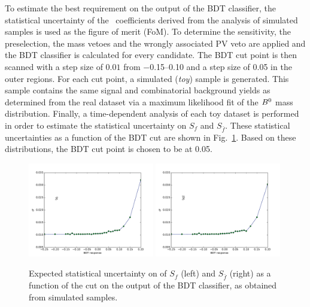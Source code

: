 To estimate the best requirement on the output of the BDT classifier, the
statistical uncertainty of the \CP~coefficients derived from the analysis of
simulated samples is used as the figure of merit (FoM). To determine the
sensitivity, the preselection, the mass vetoes and the wrongly associated PV veto
are applied and the BDT classifier is calculated for every candidate. The BDT
cut point is then scanned with a step size of $\num{0.01}$ from
\numrange{-0.15}{0.10} and a step size of \num{0.05} in the outer regions. For
each cut point, a simulated (\emph{toy}) sample is generated. This
sample contains the same signal and combinatorial background yields as determined
from the real dataset via a maximum likelihood fit of the $B^0$ mass distribution.
Finally, a time-dependent analysis of each toy dataset is performed in order to
estimate the statistical uncertainty on $S_f$ and $S_{\bar f}$.
These statistical uncertainties as a function of the BDT cut are shown in Fig.~\ref{fig:BDToptimum}. Based on
these distributions, the BDT cut point is chosen to be at \num{0.05}.
\begin{figure}[htbp]
	\begin{center}
		\includegraphics[width=0.49\textwidth]{02Selection/figs/sensitiv_Sf.pdf}
		\includegraphics[width=0.49\textwidth]{02Selection/figs/sensitiv_Sfbar.pdf}
	\end{center}
        \vspace{-4mm}
	\caption{Expected statistical uncertainty on of $S_f$ (left) and $S_{\bar f}$ (right) as a function of
	the cut on the output of the BDT classifier, as obtained from simulated samples.}
	\label{fig:BDToptimum}
\end{figure}

